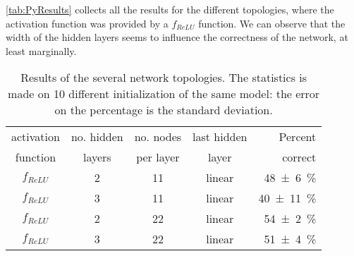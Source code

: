\autoref{tab:PyResults} collects all the results for the different topologies, where the activation function was provided by a $f_{ReLU}$ function.
We can observe that the width of the hidden layers seems to influence the correctness of the network, at least marginally.


\begin{table}[htbp]
	\centering
	\begin{tabular}{c c c c r}
	\toprule
	activation	& no. hidden 	& no. nodes	& last hidden	& Percent \\
	function		& layers 			& per layer	& layer				& correct \\
	\midrule
	$f_{ReLU}$ 			& 2 & 11 & linear & \SI{48 +- 6}{\percent} \\
	$f_{ReLU}$ 			& 3 & 11 & linear & \SI{40 +- 11}{\percent} \\
	$f_{ReLU}$ 			& 2 & 22 & linear & \SI{54 +- 2}{\percent} \\
	$f_{ReLU}$ 			& 3 & 22 & linear & \SI{51 +- 4}{\percent} \\
	\bottomrule
	\end{tabular}
	\caption{Results of the several network topologies.
	The statistics is made on \num{10} different initialization of the same model: the error on the percentage is the standard deviation.
	}
	\label{tab:PyResults}
\end{table}

